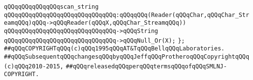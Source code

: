 \newline
\newline
\verb|qQQqqQQqqQQqqQQqscan_string|\newline
\verb|qQQqqQQqqQQqqQQqqQQqqQQqqQQqqQQq:qQQqqQQq(Reader(qQQqChar,qQQqChar_StreamqQQq)qQQq->qQQqReader(qQQqX,qQQqChar_StreamqQQq))|\newline
\verb|qQQqqQQqqQQqqQQqqQQqqQQqqQQqqQQq->qQQqString|\newline
\verb|qQQqqQQqqQQqqQQqqQQqqQQqqQQqqQQq->qQQqNull_Or(X);|\newline
\newline
\verb|};|\newline
\newline
\newline
\newline
\newline
\verb|##qQQqCOPYRIGHTqQQq(c)qQQq1995qQQqAT&TqQQqBellqQQqLaboratories.|\newline
\verb|##qQQqSubsequentqQQqchangesqQQqbyqQQqJeffqQQqProtheroqQQqCopyrightqQQq(c)qQQq2010-2015,|\newline
\verb|##qQQqreleasedqQQqperqQQqtermsqQQqofqQQqSMLNJ-COPYRIGHT.|\newline

